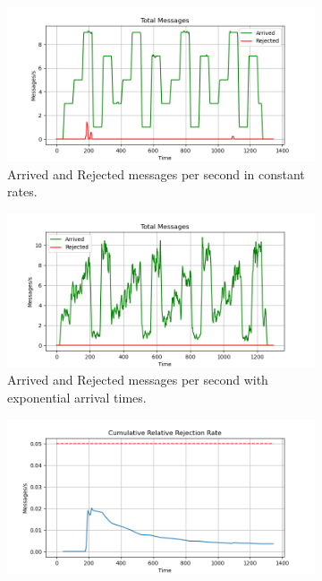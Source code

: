 \begin{figure}[H]
	\begin{subfigure}{0.49\linewidth}
	    \centering
	    \includegraphics[width=1\linewidth]{images/sliding_window/constant/messages.png}
	    \caption{Arrived and Rejected messages per second in constant rates.}
	    \label{fig:sliding_window_constant_messages}
	\end{subfigure}
	\begin{subfigure}{0.49\linewidth}
	    \centering
    		\includegraphics[width=1\linewidth]{images/sliding_window/exponential/messages.png}
	    \caption{Arrived and Rejected messages per second with exponential arrival times.}
    		\label{fig:sliding_window_exponential_messages}
	\end{subfigure}
	\begin{subfigure}{0.49\linewidth}
	    \centering
	    \includegraphics[width=1\linewidth]{images/sliding_window/constant/rejection_cumulative.png}

\end{subfigure}
\end{figure}
